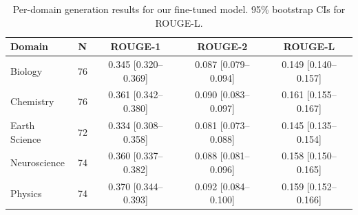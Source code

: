 \begin{table}[t]
\centering
\small
\caption{Per-domain generation results for our fine-tuned model. 95\% bootstrap CIs for ROUGE-L.}
\label{tab:gen_domain}
\begin{tabular}{lcccc}
\toprule
\textbf{Domain} & \textbf{N} & \textbf{ROUGE-1} & \textbf{ROUGE-2} & \textbf{ROUGE-L} \\
\midrule
  Biology & 76 & 0.345 [0.320--0.369] & 0.087 [0.079--0.094] & 0.149 [0.140--0.157] \\
  Chemistry & 76 & 0.361 [0.342--0.380] & 0.090 [0.083--0.097] & 0.161 [0.155--0.167] \\
  Earth Science & 72 & 0.334 [0.308--0.358] & 0.081 [0.073--0.088] & 0.145 [0.135--0.154] \\
  Neuroscience & 74 & 0.360 [0.337--0.382] & 0.088 [0.081--0.096] & 0.158 [0.150--0.165] \\
  Physics & 74 & 0.370 [0.344--0.393] & 0.092 [0.084--0.100] & 0.159 [0.152--0.166] \\
\bottomrule
\end{tabular}
\end{table}